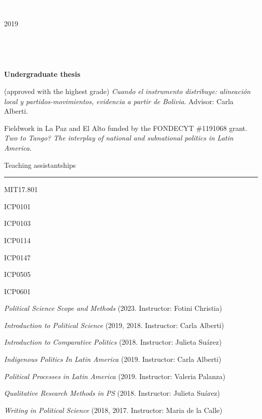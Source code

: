 \documentclass[a4paper, 12pt]{article}
\begin{document}
\begin{multicols}{2}

\textcolor{white}{XXXX}

2019

\textcolor{white}{XXXX}

\textcolor{white}{XXXX}

\columnbreak

\begin{flushright}

\textbf{Undergraduate thesis}

\medskip

(approved with the highest grade) \textit{Cuando el instrumento distribuye: alineación local y partidos-movimientos, evidencia a partir de Bolivia}. Advisor: Carla Alberti.

Fieldwork in La Paz and El Alto funded by the FONDECYT \#1191068 grant. \textit{Two to Tango? The interplay of national and subnational politics in Latin America}. 

\end{flushright}

\end{multicols}





\newpage
\large Teaching assistantships

\smallskip

\hrule

\normalsize

\begin{multicols}{2}

MIT17.801

\medskip

ICP0101

ICP0103

ICP0114

ICP0147

ICP0505

ICP0601

\columnbreak

\begin{flushright}

\textit{Political Science Scope and Methods} (2023. Instructor: Fotini Christia)

\medskip

\textit{Introduction to Political Science} (2019, 2018. Instructor: Carla Alberti)

\textit{Introduction to Comparative Politics} (2018. Instructor: Julieta Suárez)

\textit{Indigenous Politics In Latin America} (2019. Instructor: Carla Alberti) 

\textit{Political Processes in Latin America} (2019. Instructor: Valeria Palanza)

\textit{Qualitative Research Methods in PS} (2018. Instructor: Julieta Suárez)

\textit{Writing in Political Science} (2018, 2017. Instructor: Maria de la Calle)

\end{flushright}

\end{multicols}
\end{document}
